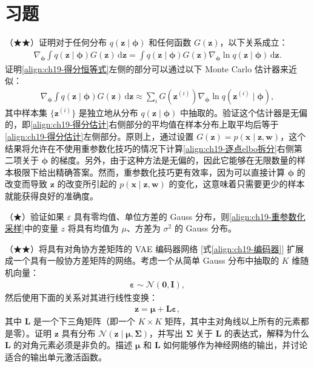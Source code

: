 \documentclass[../../main.tex]{subfiles}
\begin{document}
\section{习题}\label{section:ch19-习题}

\begin{exercise}\label{exercise:ch19-01}
（★★）证明对于任何分布 $q(\bm{z}\mid\bm{\phi})$ 和任何函数 $G(\bm{z})$，以下关系成立：
\begin{align}
\nabla_{\bm{\phi}}\int q(\bm{z}\mid\bm{\phi})G(\bm{z})\,\mathrm{d}\bm{z}=\int q(\bm{z}\mid\bm{\phi})G(\bm{z})\nabla_{\bm{\phi}}\ln q(\bm{z}\mid\bm{\phi})\,\mathrm{d}\bm{z}.
\label{align:ch19-得分恒等式}
\end{align}
证明\eqref{align:ch19-得分恒等式}左侧的部分可以通过以下 Monte Carlo 估计器来近似：
\begin{align}
\nabla_{\bm{\phi}}\int q(\bm{z}\mid\bm{\phi})G(\bm{z})\,\mathrm{d}\bm{z}\approx\sum_{i}G(\bm{z}^{(i)})\nabla_{\bm{\phi}}\ln q(\bm{z}^{(i)}\mid\bm{\phi}),
\label{align:ch19-得分估计}
\end{align}
其中样本集 $\{\bm{z}^{(i)}\}$ 是独立地从分布 $q(\bm{z}\mid\bm{\phi})$ 中抽取的。验证这个估计器是无偏的，即\eqref{align:ch19-得分估计}右侧部分的平均值在样本分布上取平均后等于\eqref{align:ch19-得分估计}左侧部分。原则上，通过设置 $G(\bm{z})=p(\bm{x}\mid\bm{z},\bm{w})$，这个结果将允许在不使用重参数化技巧的情况下计算\eqref{align:ch19-逐点elbo拆分}右侧第二项关于 $\bm{\phi}$ 的梯度。另外，由于这种方法是无偏的，因此它能够在无限数量的样本极限下给出精确答案。然而，重参数化技巧更有效率，因为可以直接计算 $\bm{\phi}$ 的改变而导致 $\bm{z}$ 的改变所引起的 $p(\bm{x}\mid\bm{z},\bm{w})$ 的变化，这意味着只需要更少的样本就能获得良好的准确度。
\end{exercise}

\begin{exercise}\label{exercise:ch19-02}
（★）验证如果 $\varepsilon$ 具有零均值、单位方差的 Gauss 分布，则\eqref{align:ch19-重参数化采样}中的变量 $z$ 将具有均值为 $\mu$、方差为 $\sigma^{2}$ 的 Gauss 分布。
\end{exercise}

\begin{exercise}\label{exercise:ch19-03}
（★★）将具有对角协方差矩阵的 VAE 编码器网络 [式\eqref{align:ch19-编码器}] 扩展成一个具有一般协方差矩阵的网络。考虑一个从简单 Gauss 分布中抽取的 $K$ 维随机向量：
\begin{align}
\bm{\varepsilon}\sim\mathcal{N}(\bm{0},\bm{I}),
\label{align:ch19-标准正态}
\end{align}
然后使用下面的关系对其进行线性变换：
\begin{align}
\bm{z}=\bm{\mu}+\bm{L}\bm{\varepsilon},
\label{align:ch19-线性变换}
\end{align}
其中 $\bm{L}$ 是一个下三角矩阵（即一个 $K\times K$ 矩阵，其中主对角线以上所有的元素都是零）。证明 $\bm{z}$ 具有分布 $\mathcal{N}(\bm{z}\mid\bm{\mu},\bm{\Sigma})$，并写出 $\bm{\Sigma}$ 关于 $\bm{L}$ 的表达式，解释为什么 $\bm{L}$ 的对角元素必须是非负的。描述 $\bm{\mu}$ 和 $\bm{L}$ 如何能够作为神经网络的输出，并讨论适合的输出单元激活函数。
\end{exercise}
\end{document}
